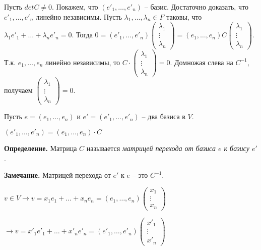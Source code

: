 Пусть $detC \neq 0$. Покажем, что $(e'_1, \dots, e'_n)$ -- базис. Достаточно доказать, что $e'_1, \dots, e'_n$ линейно независимы. Пусть $\lambda_1, \dots, \lambda_n \in F$ таковы, что $\lambda_1 e'_1 + \dots + \lambda_n e'_n = 0$. Тогда $0 = (e'_1, \dots, e'_n) \begin{pmatrix} \lambda_1 \\ \vdots \\ \lambda_n \end{pmatrix} = (e_1, \dots, e_n) C \begin{pmatrix} \lambda_1 \\ \vdots \\ \lambda_n \end{pmatrix}$. Т.к. $e_1, \dots, e_n$ линейно независимы, то $C \cdot \begin{pmatrix} \lambda_1 \\ \vdots \\ \lambda_n \end{pmatrix} = 0$. Домножая слева на $C^{-1}$, получаем $\begin{pmatrix} \lambda_1 \\ \vdots \\ \lambda_n \end{pmatrix} = 0$.

\vspace{\baselineskip}
Пусть $e = (e_1, \dots, e_n)$ и $e' = (e'_1, \dots, e'_n)$ -- два базиса в $V$.

$(e'_1, \dots, e'_n) = (e_1, \dots, e_n) \cdot C$

\vspace{\baselineskip}
\textbf{Определение.} Матрица $C$ называется \textit{матрицей перехода от базиса $e$ к базису $e'$}.

\vspace{\baselineskip}
\textbf{Замечание.} Матрицей перехода от $e'$ к $e$ -- это $C^{-1}$. 

\vspace{\baselineskip}
$v \in V \rightarrow v = x_1 e_1 + \dots + x_n e_n = (e_1, \dots, e_n) \begin{pmatrix} x_1 \\ \vdots \\ x_n \end{pmatrix}$

$\rightarrow v = x'_1 e'_1 + \dots + x'_n e'_n = (e'_1, \dots, e'_n) \begin{pmatrix} x'_1 \\ \vdots \\ x'_n \end{pmatrix}$

